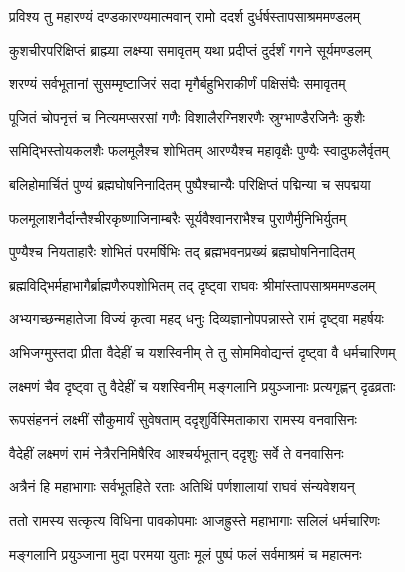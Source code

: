 
\twolineshloka
{प्रविश्य तु महारण्यं दण्डकारण्यमात्मवान्}
{रामो ददर्श दुर्धर्षस्तापसाश्रममण्डलम्} %

\twolineshloka
{कुशचीरपरिक्षिप्तं ब्राह्म्या लक्ष्म्या समावृतम्}
{यथा प्रदीप्तं दुर्दर्शं गगने सूर्यमण्डलम्} %

\twolineshloka
{शरण्यं सर्वभूतानां सुसम्मृष्टाजिरं सदा}
{मृगैर्बहुभिराकीर्णं पक्षिसंघैः समावृतम्} %

\twolineshloka
{पूजितं चोपनृत्तं च नित्यमप्सरसां गणैः}
{विशालैरग्निशरणैः स्रुग्भाण्डैरजिनैः कुशैः} %

\twolineshloka
{समिद्भिस्तोयकलशैः फलमूलैश्च शोभितम्}
{आरण्यैश्च महावृक्षैः पुण्यैः स्वादुफलैर्वृतम्} %

\twolineshloka
{बलिहोमार्चितं पुण्यं ब्रह्मघोषनिनादितम्}
{पुष्पैश्चान्यैः परिक्षिप्तं पद्मिन्या च सपद्मया} %

\twolineshloka
{फलमूलाशनैर्दान्तैश्चीरकृष्णाजिनाम्बरैः}
{सूर्यवैश्वानराभैश्च पुराणैर्मुनिभिर्युतम्} %

\twolineshloka
{पुण्यैश्च नियताहारैः शोभितं परमर्षिभिः}
{तद् ब्रह्मभवनप्रख्यं ब्रह्मघोषनिनादितम्} %

\twolineshloka
{ब्रह्मविद्भिर्महाभागैर्ब्राह्मणैरुपशोभितम्}
{तद् दृष्ट्वा राघवः श्रीमांस्तापसाश्रममण्डलम्} %

\twolineshloka
{अभ्यगच्छन्महातेजा विज्यं कृत्वा महद् धनुः}
{दिव्यज्ञानोपपन्नास्ते रामं दृष्ट्वा महर्षयः} %

\twolineshloka
{अभिजग्मुस्तदा प्रीता वैदेहीं च यशस्विनीम्}
{ते तु सोममिवोद्यन्तं दृष्ट्वा वै धर्मचारिणम्} %

\twolineshloka
{लक्ष्मणं चैव दृष्ट्वा तु वैदेहीं च यशस्विनीम्}
{मङ्गलानि प्रयुञ्जानाः प्रत्यगृह्णन् दृढव्रताः} %

\twolineshloka
{रूपसंहननं लक्ष्मीं सौकुमार्यं सुवेषताम्}
{ददृशुर्विस्मिताकारा रामस्य वनवासिनः} %

\twolineshloka
{वैदेहीं लक्ष्मणं रामं नेत्रैरनिमिषैरिव}
{आश्चर्यभूतान् ददृशुः सर्वे ते वनवासिनः} %

\twolineshloka
{अत्रैनं हि महाभागाः सर्वभूतहिते रताः}
{अतिथिं पर्णशालायां राघवं संन्यवेशयन्} %

\twolineshloka
{ततो रामस्य सत्कृत्य विधिना पावकोपमाः}
{आजह्रुस्ते महाभागाः सलिलं धर्मचारिणः} %

\twolineshloka
{मङ्गलानि प्रयुञ्जाना मुदा परमया युताः}
{मूलं पुष्पं फलं सर्वमाश्रमं च महात्मनः} %

